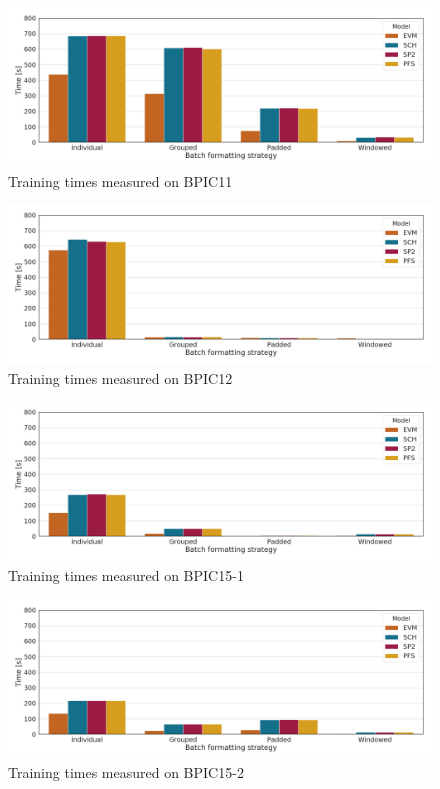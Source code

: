 \begin{figure}
    \centering
    \includegraphics[width=\textwidth]{gfx/bpic2011/train_timings.png}
    \caption{Training times measured on BPIC11}
    \label{fig:BPIC11-training-timings}
\end{figure}
\begin{figure}
    \centering
    \includegraphics[width=\textwidth]{gfx/bpic2012/train_timings.png}
    \caption{Training times measured on BPIC12}
    \label{fig:BPIC12-training-timings}
\end{figure}
\begin{figure}
    \centering
    \includegraphics[width=\textwidth]{gfx/bpic2015_1/train_timings.png}
    \caption{Training times measured on BPIC15-1}
    \label{fig:BPIC15-1-training-timings}
\end{figure}
\begin{figure}
    \centering
    \includegraphics[width=\textwidth]{gfx/bpic2015_2/train_timings.png}
    \caption{Training times measured on BPIC15-2}
    \label{fig:BPIC15-2-training-timings}
\end{figure}
